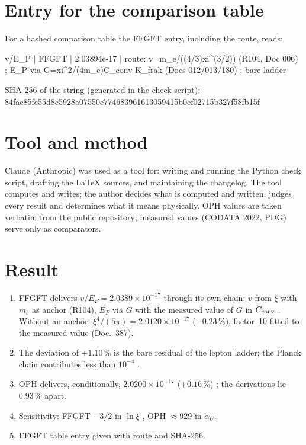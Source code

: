 \section{Entry for the comparison table}

For a hashed comparison table the FFGFT entry, including the route, reads:

\begin{center}
\begin{minipage}{0.92\textwidth}
\small\ttfamily
v/E\_P | FFGFT | 2.03894e-17 | route: v=m\_e/((4/3)xi\^{}(3/2)) (R104, Doc 006) ; E\_P via G=xi\^{}2/(4m\_e)C\_conv K\_frak (Docs 012/013/180) ; bare ladder
\end{minipage}
\end{center}

\noindent SHA-256 of the string (generated in the check script):\\
{\small\ttfamily 84fac85fc55d8c5928a07550e774683961613059415b0ef02715b327f58fb15f}

\section*{Tool and method}
Claude (Anthropic) was used as a tool for: writing and running the Python
check script, drafting the \LaTeX{} sources, and maintaining the changelog.
The tool computes and writes; the author decides what is computed and
written, judges every result and determines what it means physically. OPH
values are taken verbatim from the public repository; measured values
(CODATA 2022, PDG) serve only as comparators.

\section{Result}

\begin{enumerate}
\item FFGFT delivers $v/E_P=2.0389\times10^{-17}$ through its own chain: $v$
  from $\xi$ with $m_e$ as anchor (R104), $E_P$ via $G$ with the measured value
  of $G$ in $C_{\rm conv}$ \KM. Without an anchor: $\xi^4/(5\pi)=2.0120\times10^{-17}$
  ($-0.23\,\%$), factor~10 fitted to the measured value (Doc.~387).
\item The deviation of $+1.10\,\%$ is the bare residual of the lepton ladder;
  the Planck chain contributes less than $10^{-4}$ \KM.
\item OPH delivers, conditionally, $2.0200\times10^{-17}$ ($+0.16\,\%$) \QM;
  the derivations lie $0.93\,\%$ apart.
\item Sensitivity: FFGFT $-3/2$ in $\ln\xi$ \BM, OPH $\approx929$ in $\alpha_U$.
\item FFGFT table entry given with route and SHA-256.
\end{enumerate}

